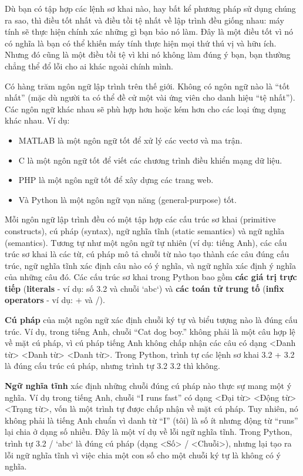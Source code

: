 Dù bạn có tập hợp các lệnh sơ khai nào, hay bất kể phương pháp sử dụng chúng ra sao, thì điều tốt nhất và điều tồi tệ nhất về lập trình đều giống nhau: máy tính sẽ thực hiện chính xác những gì bạn bảo nó làm. Đây là một điều tốt vì nó có nghĩa là bạn có thể khiến máy tính thực hiện mọi thứ thú vị và hữu ích. Nhưng đó cũng là một điều tồi tệ vì khi nó không làm đúng ý bạn, bạn thường chẳng thể đổ lỗi cho ai khác ngoài chính mình.

Có hàng trăm ngôn ngữ lập trình trên thế giới. Không có ngôn ngữ nào là ``tốt nhất'' (mặc dù người ta có thể đề cử một vài ứng viên cho danh hiệu ``tệ nhất''). Các ngôn ngữ khác nhau sẽ phù hợp hơn hoặc kém hơn cho các loại ứng dụng khác nhau. Ví dụ:

\begin{itemize}
    \item MATLAB là một ngôn ngữ tốt để xử lý các vectơ và ma trận.
    \item C là một ngôn ngữ tốt để viết các chương trình điều khiển mạng dữ liệu.
    \item PHP là một ngôn ngữ tốt để xây dựng các trang web.
    \item Và Python là một ngôn ngữ vạn năng (general-purpose) tốt.
\end{itemize}

Mỗi ngôn ngữ lập trình đều có một tập hợp các cấu trúc sơ khai (primitive constructs), cú pháp (syntax), ngữ nghĩa tĩnh (static semantics) và ngữ nghĩa (semantics). Tương tự như một ngôn ngữ tự nhiên (ví dụ: tiếng Anh), các cấu trúc sơ khai là các từ, cú pháp mô tả chuỗi từ nào tạo thành các câu đúng cấu trúc, ngữ nghĩa tĩnh xác định câu nào có ý nghĩa, và ngữ nghĩa xác định ý nghĩa của những câu đó. Các cấu trúc sơ khai trong Python bao gồm \textbf{các giá trị trực tiếp} (\textbf{literals} - ví dụ: số 3.2 và chuỗi `abc`) và \textbf{các toán tử trung tố} (\textbf{infix operators} - ví dụ: + và /).

\textbf{Cú pháp} của một ngôn ngữ xác định chuỗi ký tự và biểu tượng nào là đúng cấu trúc. Ví dụ, trong tiếng Anh, chuỗi ``Cat dog boy.'' không phải là một câu hợp lệ về mặt cú pháp, vì cú pháp tiếng Anh không chấp nhận các câu có dạng <Danh từ> <Danh từ> <Danh từ>. Trong Python, trình tự các lệnh sơ khai 3.2 + 3.2 là đúng cấu trúc cú pháp, nhưng trình tự 3.2 3.2 thì không.

\textbf{Ngữ nghĩa tĩnh} xác định những chuỗi đúng cú pháp nào thực sự mang một ý nghĩa. Ví dụ trong tiếng Anh, chuỗi ``I runs fast'' có dạng <Đại từ> <Động từ> <Trạng từ>, vốn là một trình tự được chấp nhận về mặt cú pháp. Tuy nhiên, nó không phải là tiếng Anh chuẩn vì danh từ ``I'' (tôi) là số ít nhưng động từ ``runs'' lại chia ở dạng số nhiều. Đây là một ví dụ về lỗi ngữ nghĩa tĩnh. Trong Python, trình tự 3.2 / `abc` là đúng cú pháp (dạng <Số> / <Chuỗi>), nhưng lại tạo ra lỗi ngữ nghĩa tĩnh vì việc chia một con số cho một chuỗi ký tự là không có ý nghĩa.

